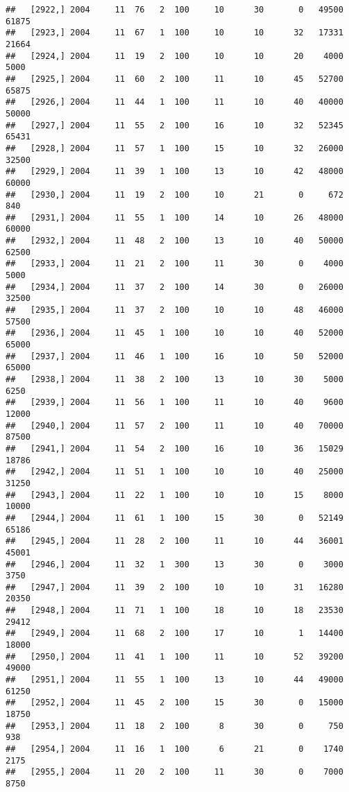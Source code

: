 \documentclass{article}\usepackage[]{graphicx}\usepackage[]{color}
\makeatletter
\newenvironment{kframe}{%
 \def\at@end@of@kframe{}%
 \ifinner\ifhmode%
  \def\at@end@of@kframe{\end{minipage}}%
  \begin{minipage}{\columnwidth}%
 \fi\fi%
 \def\FrameCommand##1{\hskip\@totalleftmargin \hskip-\fboxsep
 \colorbox{shadecolor}{##1}\hskip-\fboxsep
     \hskip-\linewidth \hskip-\@totalleftmargin \hskip\columnwidth}%
 \MakeFramed {\advance\hsize-\width
   \@totalleftmargin\z@ \linewidth\hsize
   \@setminipage}}%
 {\par\unskip\endMakeFramed%
 \at@end@of@kframe}
\newenvironment{knitrout}{}{} %
\makeatother
\begin{document}
\begin{knitrout}
\begin{kframe}
\begin{verbatim}
##   [2922,] 2004     11  76   2  100     10      30       0   49500   61875
##   [2923,] 2004     11  67   1  100     10      10      32   17331   21664
##   [2924,] 2004     11  19   2  100     10      10      20    4000    5000
##   [2925,] 2004     11  60   2  100     11      10      45   52700   65875
##   [2926,] 2004     11  44   1  100     11      10      40   40000   50000
##   [2927,] 2004     11  55   2  100     16      10      32   52345   65431
##   [2928,] 2004     11  57   1  100     15      10      32   26000   32500
##   [2929,] 2004     11  39   1  100     13      10      42   48000   60000
##   [2930,] 2004     11  19   2  100     10      21       0     672     840
##   [2931,] 2004     11  55   1  100     14      10      26   48000   60000
##   [2932,] 2004     11  48   2  100     13      10      40   50000   62500
##   [2933,] 2004     11  21   2  100     11      30       0    4000    5000
##   [2934,] 2004     11  37   2  100     14      30       0   26000   32500
##   [2935,] 2004     11  37   2  100     10      10      48   46000   57500
##   [2936,] 2004     11  45   1  100     10      10      40   52000   65000
##   [2937,] 2004     11  46   1  100     16      10      50   52000   65000
##   [2938,] 2004     11  38   2  100     13      10      30    5000    6250
##   [2939,] 2004     11  56   1  100     11      10      40    9600   12000
##   [2940,] 2004     11  57   2  100     11      10      40   70000   87500
##   [2941,] 2004     11  54   2  100     16      10      36   15029   18786
##   [2942,] 2004     11  51   1  100     10      10      40   25000   31250
##   [2943,] 2004     11  22   1  100     10      10      15    8000   10000
##   [2944,] 2004     11  61   1  100     15      30       0   52149   65186
##   [2945,] 2004     11  28   2  100     11      10      44   36001   45001
##   [2946,] 2004     11  32   1  300     13      30       0    3000    3750
##   [2947,] 2004     11  39   2  100     10      10      31   16280   20350
##   [2948,] 2004     11  71   1  100     18      10      18   23530   29412
##   [2949,] 2004     11  68   2  100     17      10       1   14400   18000
##   [2950,] 2004     11  41   1  100     11      10      52   39200   49000
##   [2951,] 2004     11  55   1  100     13      10      44   49000   61250
##   [2952,] 2004     11  45   2  100     15      30       0   15000   18750
##   [2953,] 2004     11  18   2  100      8      30       0     750     938
##   [2954,] 2004     11  16   1  100      6      21       0    1740    2175
##   [2955,] 2004     11  20   2  100     11      30       0    7000    8750

\end{verbatim}
\end{kframe}
\end{knitrout}
\end{document}
